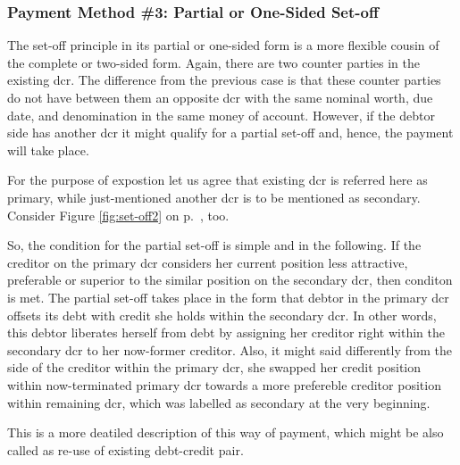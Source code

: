 \subsubsection*{Payment Method \#3: Partial or One-Sided Set-off}

The set-off principle in its partial or one-sided form is a more flexible cousin of the complete or two-sided form. Again, there are two counter parties in the existing \acf{dcr}. The difference from the previous case is that these counter parties do not have between them an opposite \ac{dcr} with the same nominal worth, due date, and denomination in the same money of account. However, if the debtor side has another \ac{dcr} it might qualify for a partial set-off and, hence, the payment will take place.

For the purpose of expostion let us agree that existing \ac{dcr} is referred here as primary, while just-mentioned another \ac{dcr} is to be mentioned as secondary. Consider Figure \ref{fig:set-off2} on p.~\pageref{fig:set-off2}, too.

So, the condition for the partial set-off is simple and in the following. If the creditor on the primary \ac{dcr} considers her current position less attractive, preferable or superior to the similar position on the secondary \ac{dcr}, then conditon is met. The partial set-off takes place in the form that debtor in the primary \ac{dcr} offsets its debt with credit she holds within the secondary \ac{dcr}. In other words, this debtor liberates herself from debt by assigning her creditor right within the secondary \ac{dcr} to her now-former creditor.
Also, it might said differently from the side of the creditor within the primary \ac{dcr}, she swapped her credit position within now-terminated primary \ac{dcr} towards a more prefereble creditor position within remaining \ac{dcr}, which was labelled as secondary at the very beginning.

This is a more deatiled description of this way of payment, which might be also called as re-use of existing debt-credit pair.


